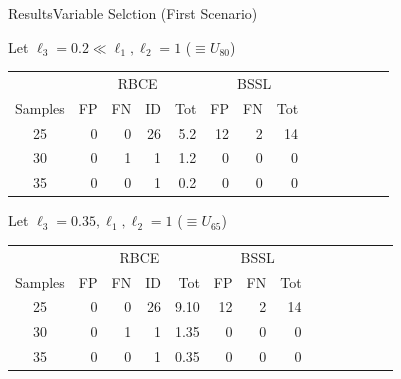 \documentclass[aspectratio=169]{beamer}					%
\begin{document}

\begin{frame}{Results}{Variable Selction (First Scenario)}

Let \alert{$\ell_3 = 0.2 \ll \ell_1,\ell_2 = 1$ ($\equiv U_{80}$)}

\begin{table}[h]
    \centering
    \begin{tabular}{|c||rrr|r||rr|r||rr|r||rr|r|}
  \hline
  &\multicolumn{4}{c||}{RBCE}&\multicolumn{3}{c|}{BSSL}\\
  \cline{2-14}
 Samples & FP & FN & ID & Tot & FP & FN & Tot \\ 
  \hline
25 &   0 &   0 &  26 & 5.2 &  12 &   2 & 14\\ 
  30 &   0 &   1 &   1 & 1.2 &  0 &   0 & 0\\ 
  35 &   0 &   0 &   1 & 0.2 &  0 &   0 & 0\\ 
  \hline
\end{tabular}
\end{table}
\pause
Let \alert{$\ell_3 = 0.35, \ell_1,\ell_2 = 1$ ($\equiv U_{65}$)}

\begin{table}[h]
    \centering
    \begin{tabular}{|c||rrr|r||rr|r||rr|r||rr|r|}
  \hline
  &\multicolumn{4}{c||}{RBCE}&\multicolumn{3}{c|}{BSSL}\\
  \cline{2-14}
 Samples & FP & FN & ID & Tot & FP & FN & Tot \\ 
  \hline
25 &   0 &   0 &  26 & 9.10 &  12 &   2 & 14\\ 
  30 &   0 &   1 &   1 & 1.35 &  0 &   0 & 0\\ 
  35 &   0 &   0 &   1 & 0.35 &  0 &   0 & 0\\ 
  \hline
\end{tabular}
\end{table}

\end{frame}
\end{document}
